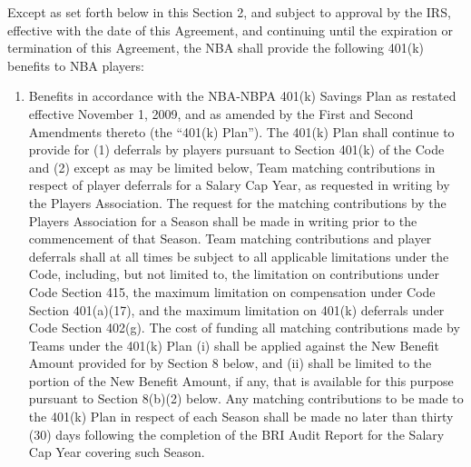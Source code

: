 \documentclass[
]{book}
\begin{document}
Except as set forth below in this Section 2, and subject to approval by the IRS, effective with the date of this Agreement, and continuing until the expiration or termination of this Agreement, the NBA shall provide the following 401(k) benefits to NBA players:

\begin{enumerate}
\def\labelenumi{(\alph{enumi})}
\item
  Benefits in accordance with the NBA-NBPA 401(k) Savings Plan as restated effective November 1, 2009, and as amended by the First and Second Amendments thereto (the ``401(k) Plan''). The 401(k) Plan shall continue to provide for (1) deferrals by players pursuant to Section 401(k) of the Code and (2) except as may be limited below, Team matching contributions in respect of player deferrals for a Salary Cap Year, as requested in writing by the Players Association. The request for the matching contributions by the Players Association for a Season shall be made in writing prior to the commencement of that Season. Team matching contributions and player deferrals shall at all times be subject to all applicable limitations under the Code, including, but not limited to, the limitation on contributions under Code Section 415, the maximum limitation on compensation under Code Section 401(a)(17), and the maximum limitation on 401(k) deferrals under Code Section 402(g). The cost of funding all matching contributions made by Teams under the 401(k) Plan (i) shall be applied against the New Benefit Amount provided for by Section 8 below, and (ii) shall be limited to the portion of the New Benefit Amount, if any, that is available for this purpose pursuant to Section 8(b)(2) below. Any matching contributions to be made to the 401(k) Plan in respect of each Season shall be made no later than thirty (30) days following the completion of the BRI Audit Report for the Salary Cap Year covering such Season.


\end{enumerate}
\end{document}
